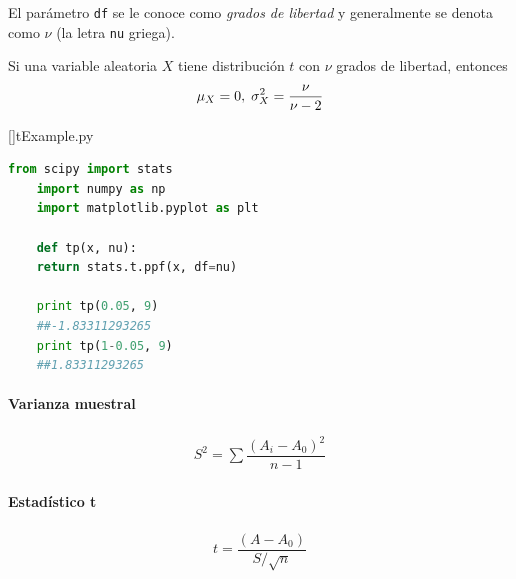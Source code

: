 El parámetro \texttt{df} se le conoce como \emph{grados de libertad} y generalmente se denota como $\nu$ (la letra \texttt{nu} griega).


Si una variable aleatoria $X$ tiene distribución $t$ con $\nu$ grados de libertad, entonces
\begin{align}
	\mu_{X}=0, \; \sigma^{2}_{X}=\dfrac{\nu}{\nu-2}
\end{align}





[]{tExample.py}
\begin{lstlisting}[language=Python]
	from scipy import stats
	import numpy as np
	import matplotlib.pyplot as plt
	
	def tp(x, nu):
	return stats.t.ppf(x, df=nu)
	
	print tp(0.05, 9)
	##-1.83311293265
	print tp(1-0.05, 9)
	##1.83311293265
\end{lstlisting}

\paragraph{Varianza muestral}
\begin{align}
	S^{2}=\sum\dfrac{\left( A_{i}-A_{0} \right)^{2}}{n-1}
\end{align}


\paragraph{Estadístico t}
\begin{align}
	t = \dfrac{\left( A-A_{0} \right)}{S/\sqrt{n}}
\end{align}


